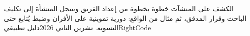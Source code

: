 \documentclass{report}
\begin{document}
{الكشف على المنشآت خطوة بخطوة}
{من إعداد الفريق وسجل المنشأة إلى تكليف الباحث وقرار المدقق، ثم مثال من الواقع: دورية تموينية على الأفران وضبط يُتابع حتى التسوية.}
{تشرين الثاني 2026}{دليل تطبيقي}{RightCode}
\tableofcontents


\end{document}
